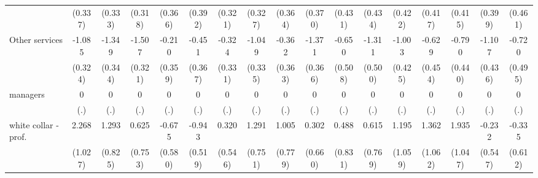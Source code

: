 {\begin{tabular}{l*{16}{c}}
                    &     (0.337)         &     (0.333)         &     (0.318)         &     (0.366)         &     (0.392)         &     (0.321)         &     (0.327)         &     (0.364)         &     (0.370)         &     (0.431)         &     (0.434)         &     (0.422)         &     (0.417)         &     (0.415)         &     (0.399)         &     (0.461)         \\
[1em]
Other services      &      -1.085\sym{***}&      -1.349\sym{***}&      -1.507\sym{***}&      -0.210         &      -0.451         &      -0.324         &      -1.049\sym{**} &      -0.362         &      -1.371\sym{***}&      -0.650         &      -1.311\sym{**} &      -1.003\sym{*}  &      -0.629         &      -0.790         &      -1.107\sym{*}  &      -0.720         \\
                    &     (0.324)         &     (0.344)         &     (0.321)         &     (0.359)         &     (0.367)         &     (0.331)         &     (0.335)         &     (0.363)         &     (0.366)         &     (0.508)         &     (0.500)         &     (0.425)         &     (0.454)         &     (0.440)         &     (0.436)         &     (0.495)         \\
[1em]
managers            &           0         &           0         &           0         &           0         &           0         &           0         &           0         &           0         &           0         &           0         &           0         &           0         &           0         &           0         &           0         &           0         \\
                    &         (.)         &         (.)         &         (.)         &         (.)         &         (.)         &         (.)         &         (.)         &         (.)         &         (.)         &         (.)         &         (.)         &         (.)         &         (.)         &         (.)         &         (.)         &         (.)         \\
[1em]
white collar - prof.&       2.268\sym{*}  &       1.293         &       0.625         &      -0.675         &      -0.943         &       0.320         &       1.291         &       1.005         &       0.302         &       0.488         &       0.615         &       1.195         &       1.362         &       1.935         &      -0.232         &      -0.335         \\
                    &     (1.027)         &     (0.825)         &     (0.753)         &     (0.580)         &     (0.519)         &     (0.546)         &     (0.751)         &     (0.779)         &     (0.660)         &     (0.831)         &     (0.769)         &     (1.059)         &     (1.062)         &     (1.047)         &     (0.547)         &     (0.612)         \\

\end{tabular}}
